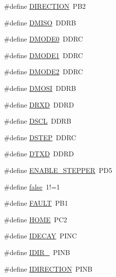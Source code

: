 \begin{DoxyCompactItemize}
\item 
\#define \hyperlink{group__biba__config_ga1d692daf1ffadae2243a5ab556589629}{D\-I\-R\-E\-C\-T\-I\-O\-N}~P\-B2
\item 
\#define \hyperlink{group__biba__config_gafc00dbf97764b4d68c05e9bfc6761e4d}{D\-M\-I\-S\-O}~D\-D\-R\-B
\item 
\#define \hyperlink{group__biba__config_ga652846ae5576cfc7a97e79569c9b9426}{D\-M\-O\-D\-E0}~D\-D\-R\-C
\item 
\#define \hyperlink{group__biba__config_ga583975602ab120ab85362c7281e4b1dc}{D\-M\-O\-D\-E1}~D\-D\-R\-C
\item 
\#define \hyperlink{group__biba__config_gab30b2507134f18696809327fcfb86c51}{D\-M\-O\-D\-E2}~D\-D\-R\-C
\item 
\#define \hyperlink{group__biba__config_ga1421c0c377bbe274867c9dbaca51d707}{D\-M\-O\-S\-I}~D\-D\-R\-B
\item 
\#define \hyperlink{group__biba__config_ga90f5e4a0bd154d1e2b2a6f688dced82e}{D\-R\-X\-D}~D\-D\-R\-D
\item 
\#define \hyperlink{group__biba__config_ga813e08916fb1e6f00505d36e1bb830c3}{D\-S\-C\-L}~D\-D\-R\-B
\item 
\#define \hyperlink{group__biba__config_gafec4ba65dc31b3c5c4ca6a3471054994}{D\-S\-T\-E\-P}~D\-D\-R\-C
\item 
\#define \hyperlink{group__biba__config_gafcb7b56ec9ef5d20fcc86f61034a6a73}{D\-T\-X\-D}~D\-D\-R\-D
\item 
\#define \hyperlink{group__biba__config_gaf43f2237d47f7e2e48d74999befaa9fd}{E\-N\-A\-B\-L\-E\-\_\-\-S\-T\-E\-P\-P\-E\-R}~P\-D5
\item 
\#define \hyperlink{group__biba__config_ga65e9886d74aaee76545e83dd09011727}{false}~1!=1
\item 
\#define \hyperlink{group__biba__config_ga4115eb21750f37d540839cc51fca5401}{F\-A\-U\-L\-T}~P\-B1
\item 
\#define \hyperlink{group__biba__config_ga0e26ea2db1b570d1a6fe1ac180ef4541}{H\-O\-M\-E}~P\-C2
\item 
\#define \hyperlink{group__biba__config_ga7295c6f7b10d528d2a6878ddb5cedee9}{I\-D\-E\-C\-A\-Y}~P\-I\-N\-C
\item 
\#define \hyperlink{group__biba__config_ga8c1dcb1285a3f6b595aa403bfc2046e9}{I\-D\-I\-R\-\_}~P\-I\-N\-B
\item 
\#define \hyperlink{group__biba__config_ga05466c17e001989bf527098e9ea8b20c}{I\-D\-I\-R\-E\-C\-T\-I\-O\-N}~P\-I\-N\-B
\item 

\end{DoxyCompactItemize}
